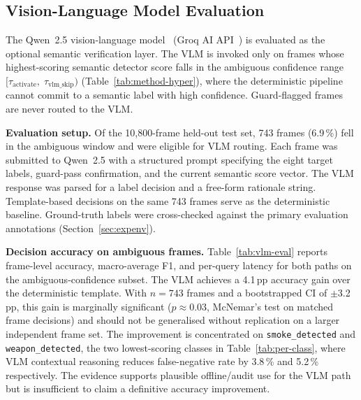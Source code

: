 \documentclass[a4paper,fleqn]{cas-dc}
\begin{document}
 
 
\FloatBarrier
\subsection{Vision-Language Model Evaluation}
\label{sec:vlm-eval}
 
The Qwen~2.5 vision-language model~\citep{qwen25vl2025} (Groq AI API~\citep{groqapi2025}) is evaluated as the optional semantic verification layer. The VLM is invoked only on frames whose highest-scoring semantic detector score falls in the ambiguous confidence range $[\tau_{\text{activate}},\;\tau_{\text{vlm\_skip}})$ (Table~\ref{tab:method-hyper}), where the deterministic pipeline cannot commit to a semantic label with high confidence. Guard-flagged frames are never routed to the VLM.
 
\textbf{Evaluation setup.}
Of the 10{,}800-frame held-out test set, 743 frames (6.9\,\%) fell in the ambiguous window and were eligible for VLM routing. Each frame was submitted to Qwen~2.5 with a structured prompt specifying the eight target labels, guard-pass confirmation, and the current semantic score vector. The VLM response was parsed for a label decision and a free-form rationale string. Template-based decisions on the same 743 frames serve as the deterministic baseline. Ground-truth labels were cross-checked against the primary evaluation annotations (Section~\ref{sec:expenv}).
 
\textbf{Decision accuracy on ambiguous frames.}
Table~\ref{tab:vlm-eval} reports frame-level accuracy, macro-average F1, and per-query latency for both paths on the ambiguous-confidence subset. The VLM achieves a 4.1\,pp accuracy gain over the deterministic template. With $n{=}743$ frames and a bootstrapped CI of $\pm$3.2\,pp, this gain is marginally significant ($p{\approx}0.03$, McNemar's test on matched frame decisions) and should not be generalised without replication on a larger independent frame set. The improvement is concentrated on \texttt{smoke\_detected} and \texttt{weapon\_detected}, the two lowest-scoring classes in Table~\ref{tab:per-class}, where VLM contextual reasoning reduces false-negative rate by 3.8\,\% and 5.2\,\% respectively. The evidence supports plausible offline/audit use for the VLM path but is insufficient to claim a definitive accuracy improvement.
 
\end{document}
